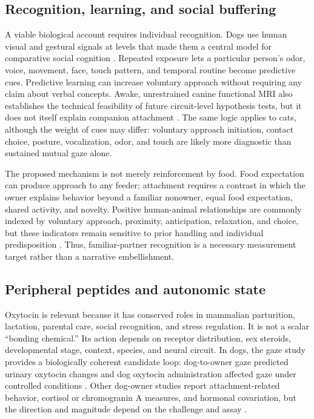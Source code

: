 \documentclass[conference]{IEEEtran}
\begin{document}
\subsection{Recognition, learning, and social buffering}

A viable biological account requires individual recognition. Dogs use human visual and gestural signals at levels that made them a central model for comparative social cognition \cite{hare2005,miklosi2013,udell2016}. Repeated exposure lets a particular person's odor, voice, movement, face, touch pattern, and temporal routine become predictive cues. Predictive learning can increase voluntary approach without requiring any claim about verbal concepts. Awake, unrestrained canine functional MRI also establishes the technical feasibility of future circuit-level hypothesis tests, but it does not itself explain companion attachment \cite{berns2012}. The same logic applies to cats, although the weight of cues may differ: voluntary approach initiation, contact choice, posture, vocalization, odor, and touch are likely more diagnostic than sustained mutual gaze alone.

The proposed mechanism is not merely reinforcement by food. Food expectation can produce approach to any feeder; attachment requires a contrast in which the owner explains behavior beyond a familiar nonowner, equal food expectation, shared activity, and novelty. Positive human-animal relationships are commonly indexed by voluntary approach, proximity, anticipation, relaxation, and choice, but these indicators remain sensitive to prior handling and individual predisposition \cite{rault2020}. Thus, familiar-partner recognition is a necessary measurement target rather than a narrative embellishment.

\subsection{Peripheral peptides and autonomic state}

Oxytocin is relevant because it has conserved roles in mammalian parturition, lactation, parental care, social recognition, and stress regulation. It is not a scalar ``bonding chemical.'' Its action depends on receptor distribution, sex steroids, developmental stage, context, species, and neural circuit. In dogs, the gaze study provides a biologically coherent candidate loop: dog-to-owner gaze predicted urinary oxytocin changes and dog oxytocin administration affected gaze under controlled conditions \cite{nagasawa2015}. Other dog-owner studies report attachment-related behavior, cortisol or chromogranin A measures, and hormonal covariation, but the direction and magnitude depend on the challenge and assay \cite{ryan2019,handlin2015}.
\end{document}
